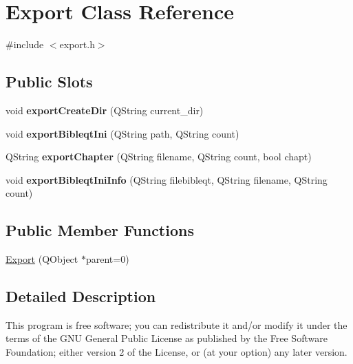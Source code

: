 \hypertarget{classExport}{
\section{Export Class Reference}
\label{classExport}
}


{\ttfamily \#include $<$export.h$>$}

\subsection*{Public Slots}
\begin{DoxyCompactItemize}
\item 
\hypertarget{classExport_a823fe6c912f5efb3f45469c4280929ae}{
void {\bfseries exportCreateDir} (QString current\_\-dir)}
\label{classExport_a823fe6c912f5efb3f45469c4280929ae}

\item 
\hypertarget{classExport_a583654b0f792a05f4ee11004682fe5e8}{
void {\bfseries exportBibleqtIni} (QString path, QString count)}
\label{classExport_a583654b0f792a05f4ee11004682fe5e8}

\item 
\hypertarget{classExport_a9e27b8a6ef6f7cf6dd3675ba87ec00fe}{
QString {\bfseries exportChapter} (QString filename, QString count, bool chapt)}
\label{classExport_a9e27b8a6ef6f7cf6dd3675ba87ec00fe}

\item 
\hypertarget{classExport_af57c9a5ff17a6c14f2394180ee91c2a4}{
void {\bfseries exportBibleqtIniInfo} (QString filebibleqt, QString filename, QString count)}
\label{classExport_af57c9a5ff17a6c14f2394180ee91c2a4}

\end{DoxyCompactItemize}
\subsection*{Public Member Functions}
\begin{DoxyCompactItemize}
\item 
\hyperlink{classExport_a6e1250a8055928efd7568de345ca10bf}{Export} (QObject $\ast$parent=0)
\end{DoxyCompactItemize}


\subsection{Detailed Description}
This program is free software; you can redistribute it and/or modify it under the terms of the GNU General Public License as published by the Free Software Foundation; either version 2 of the License, or (at your option) any later version.

